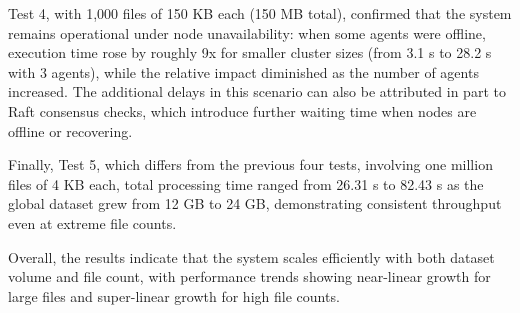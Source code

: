 Test 4, with 1,000 files of 150 KB each (150 MB total), confirmed that the system remains operational under node unavailability: when some agents were offline, execution time rose by roughly 9x for smaller cluster sizes (from 3.1 s to 28.2 s with 3 agents), while the relative impact diminished as the number of agents increased. The additional delays in this scenario can also be attributed in part to Raft consensus checks, which introduce further waiting time when nodes are offline or recovering.

Finally, Test 5, which differs from the previous four tests, involving one million files of 4 KB each, total processing time
ranged from 26.31 s to 82.43 s as the global dataset grew from 12 GB to 24 GB,
demonstrating consistent throughput even at extreme file counts.

Overall, the results indicate that the system scales efficiently with both dataset volume and file count, with performance trends showing near-linear growth for large files and super-linear growth for high file counts.
